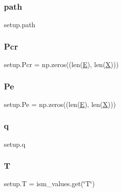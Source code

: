 \subsubsection{\texorpdfstring{path}{path}}
{\footnotesize\ttfamily setup.\+path}

\mbox{\label{namespacesetup_a1b0b951c6726e43eb28a24e3d79a3758}} 
\subsubsection{\texorpdfstring{Pcr}{Pcr}}
{\footnotesize\ttfamily setup.\+Pcr = np.\+zeros((len(\hyperlink{namespacesetup_a8bf3113e27e2925ec3309507c6d5ebf2}{E}), len(\hyperlink{namespacesetup_a0d71901ea06bb31a1b5e9e742158486f}{X})))}

\mbox{\label{namespacesetup_afb73f0e8863cbbacea9afd35ddaa95de}} 
\subsubsection{\texorpdfstring{Pe}{Pe}}
{\footnotesize\ttfamily setup.\+Pe = np.\+zeros((len(\hyperlink{namespacesetup_a8bf3113e27e2925ec3309507c6d5ebf2}{E}), len(\hyperlink{namespacesetup_a0d71901ea06bb31a1b5e9e742158486f}{X})))}

\mbox{\label{namespacesetup_a8f9219fcf5e99ad6498333cdec29baab}} 
\subsubsection{\texorpdfstring{q}{q}}
{\footnotesize\ttfamily setup.\+q}

\mbox{\label{namespacesetup_a967578daac54f21f0f8b24f138989582}} 
\subsubsection{\texorpdfstring{T}{T}}
{\footnotesize\ttfamily setup.\+T = ism\+\_\+values.\+get(\char`\"{}T\char`\"{})}

\mbox{\label{namespacesetup_ab4fe88c1c5de82b95f19e3381c50a763}} 
